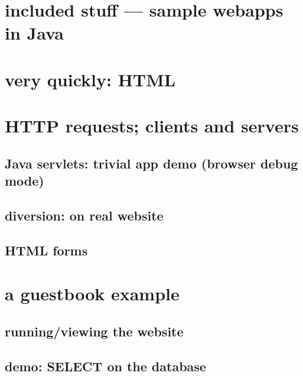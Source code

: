 \newcommand{\nred}[1]{{\color{red!60!black}\bfseries #1}}
\newcommand{\nblack}[1]{\textbf{#1}}


\begin{frame}
    \titlepage
\end{frame}

\section{included stuff --- sample webapps in Java}

\section{very quickly: HTML}



\section{HTTP requests; clients and servers}



\subsection{Java servlets: trivial app demo (browser debug mode)}



\subsection{diversion: on real website}

\subsection{HTML forms}



\section{a guestbook example}

\subsection{running/viewing the website}

\subsection{demo: SELECT on the database}

